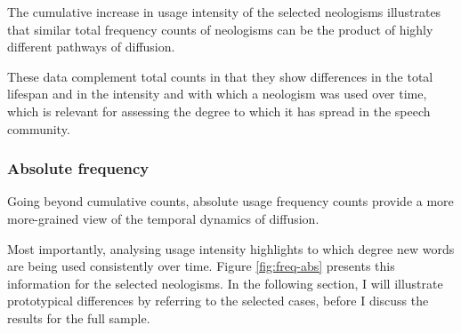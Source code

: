 \documentclass[
  a4paper,
  abstract=on,
  captions=tableabove
  ]{scrartcl}
\begin{document}
      The cumulative increase in usage intensity of the selected neologisms illustrates that similar total frequency counts of neologisms can be the product of highly different pathways of diffusion.

      These data complement total counts in that they show differences in the total lifespan and in the intensity and with which a neologism was used over time, which is relevant for assessing the degree to which it has spread in the speech community.


    \subsubsection{Absolute frequency}

      Going beyond cumulative counts, absolute usage frequency counts provide a more more-grained view of the temporal dynamics of diffusion.


      Most importantly, analysing usage intensity highlights to which degree new words are being used consistently over time. Figure \ref{fig:freq-abs} presents this information for the selected neologisms. In the following section, I will illustrate prototypical differences by referring to the selected cases, before I discuss the results for the full sample.
\end{document}
